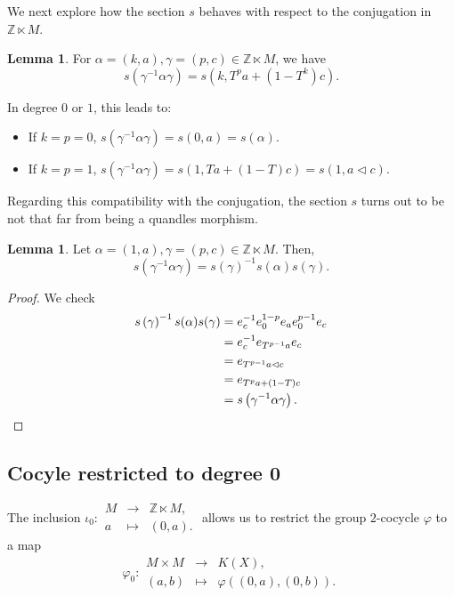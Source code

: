\documentclass[a4paper,11pt]{amsart}
\theoremstyle{definition}
\newtheorem{lem}[thm]{Lemma}
\newcommand{\Z}{{\mathbb Z}}
\begin{document}
We next explore how the section $s$ behaves with respect to the conjugation in $\Z\ltimes M$.

\begin{lem}
For $\alpha=(k,a), \gamma=(p,c)\in \Z\ltimes M$, we have
\[
s\left (\gamma^{-1} \alpha \gamma\right ) = s\left (k, T^p a + (1-T^k)c \right ).
\]
\end{lem}

In degree $0$ or $1$, this leads to:
\begin{itemize}
\item If $k=p=0$, $s\left (\gamma^{-1} \alpha \gamma\right ) = s\left (0, a \right ) = s(\alpha).$
\item If $k=p=1$, $s\left (\gamma^{-1} \alpha \gamma\right ) = s\left (1, T a + (1-T)c \right ) = s\left (1, a\lhd c\right ).$
\end{itemize}

Regarding this compatibility with the conjugation, the section $s$ turns out to be not that far from being a quandles morphism.
\begin{lem}
Let $\alpha=(1,a),\gamma=(p,c)\in \Z\ltimes M$.
Then,
\[
s\left (\gamma^{-1} \alpha \gamma \right ) = s \left (\gamma \right )^{-1} s(\alpha ) s(\gamma).
\]
\end{lem}

\begin{proof}
We check
\begin{align*}
s \left (\gamma \right )^{-1} s(\alpha ) s(\gamma) & = e_c^{-1} e_0^{1-p} e_a e_0^{p-1} e_c\\
& = e_c^{-1} e_{T^{p-1} a} e_c \\
& = e_{T^{p-1} a\lhd c} \\
& = e_{T^p a +(1-T)c} \\
& = s \left ( \gamma^{-1} \alpha \gamma\right ).\qedhere
\end{align*}
\end{proof}

\subsection{Cocyle restricted to degree 0}
The inclusion $\iota_0\colon \begin{array}{lcl}
M & \longrightarrow & \Z\ltimes M, \\
a & \longmapsto & (0,a).
\end{array} $ allows us to restrict the group $2$-cocycle $\varphi$ to a map
\[
\varphi_0\colon \begin{array}{lcl}
M \times M & \longrightarrow & K(X),\\
(a,b) & \longmapsto & \varphi( (0,a), (0,b)).
\end{array}
\]
\end{document}
